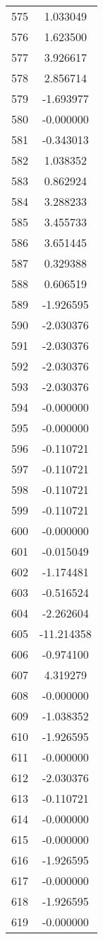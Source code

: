 \documentclass[12pt]{article}
\begin{document}
\begin{longtable}{@{}cc@{}}
575 & 1.033049 \\
576 & 1.623500 \\
577 & 3.926617 \\
578 & 2.856714 \\
579 & -1.693977 \\
580 & -0.000000 \\
581 & -0.343013 \\
582 & 1.038352 \\
583 & 0.862924 \\
584 & 3.288233 \\
585 & 3.455733 \\
586 & 3.651445 \\
587 & 0.329388 \\
588 & 0.606519 \\
589 & -1.926595 \\
590 & -2.030376 \\
591 & -2.030376 \\
592 & -2.030376 \\
593 & -2.030376 \\
594 & -0.000000 \\
595 & -0.000000 \\
596 & -0.110721 \\
597 & -0.110721 \\
598 & -0.110721 \\
599 & -0.110721 \\
600 & -0.000000 \\
601 & -0.015049 \\
602 & -1.174481 \\
603 & -0.516524 \\
604 & -2.262604 \\
605 & -11.214358 \\
606 & -0.974100 \\
607 & 4.319279 \\
608 & -0.000000 \\
609 & -1.038352 \\
610 & -1.926595 \\
611 & -0.000000 \\
612 & -2.030376 \\
613 & -0.110721 \\
614 & -0.000000 \\
615 & -0.000000 \\
616 & -1.926595 \\
617 & -0.000000 \\
618 & -1.926595 \\
619 & -0.000000 \\

\end{longtable}
\end{document}
